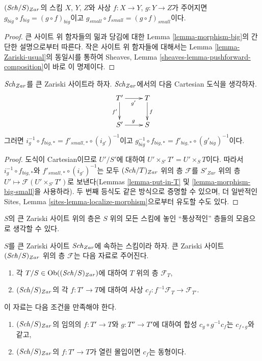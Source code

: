 \begin{lemma}
\label{lemma-composition}
$(\mathit{Sch}/S)_{Zar}$의 스킴 $X$, $Y$, $Z$와 사상 $f : X \to Y$,
$g : Y \to Z$가 주어지면
$g_{big} \circ f_{big} = (g \circ f)_{big}$이고
$g_{small} \circ f_{small} = (g \circ f)_{small}$이다.
\end{lemma}

\begin{proof}
큰 사이트 위 함자들의 밂과 당김에 대한 Lemma
\ref{lemma-morphism-big}의 간단한 설명으로부터 따른다. 작은 사이트 위
함자들에 대해서는 Lemma \ref{lemma-Zariski-usual}의 동일시를 통하여
Sheaves, Lemma \ref{sheaves-lemma-pushforward-composition}이 바로 이
명제이다.
\end{proof}

\begin{lemma}
\label{lemma-morphism-big-small-cartesian-diagram}
$\mathit{Sch}_{Zar}$를 큰 Zariski 사이트라 하자. $\mathit{Sch}_{Zar}$에서의 다음
Cartesian 도식을 생각하자.
$$
\xymatrix{
T' \ar[r]_{g'} \ar[d]_{f'} & T \ar[d]^f \\
S' \ar[r]^g & S
}
$$
그러면
$i_g^{-1} \circ f_{big, *} = f'_{small, *} \circ (i_{g'})^{-1}$이고
$g_{big}^{-1} \circ f_{big, *} = f'_{big, *} \circ (g'_{big})^{-1}$이다.
\end{lemma}

\begin{proof}
도식이 Cartesian이므로 $U'/S'$에 대하여
$U' \times_{S'} T' = U' \times_S T$이다. 따라서
$i_g^{-1} \circ f_{big, *}$와 $f'_{small, *} \circ (i_{g'})^{-1}$는 모두
$(\mathit{Sch}/T)_{Zar}$ 위의 층 $\mathcal{F}$를 $S'_{Zar}$ 위의 층
$U' \mapsto \mathcal{F}(U' \times_{S'} T')$로 보낸다(Lemmas
\ref{lemma-put-in-T} 및 \ref{lemma-morphism-big-small}을 사용하라).
두 번째 등식도 같은 방식으로 증명할 수 있으며, 더 일반적인 Sites,
Lemma \ref{sites-lemma-localize-morphism}으로부터 유도할 수도 있다.
\end{proof}

\noindent
$S$의 큰 Zariski 사이트 위의 층은 $S$ 위의 모든 스킴에 놓인
``통상적인'' 층들의 모음으로 생각할 수 있다.

\begin{lemma}
\label{lemma-characterize-sheaf-big}
$S$를 큰 Zariski 사이트 $\mathit{Sch}_{Zar}$에 속하는 스킴이라 하자. 큰
Zariski 사이트 $(\mathit{Sch}/S)_{Zar}$ 위의 층 $\mathcal{F}$는 다음 자료로
주어진다.
\begin{enumerate}
\item 각 $T/S \in \mathop{\mathrm{Ob}}\nolimits((\mathit{Sch}/S)_{Zar})$에 대하여 $T$ 위의 층
$\mathcal{F}_T$,
\item $(\mathit{Sch}/S)_{Zar}$의 각 $f : T' \to T$에 대하여 사상
$c_f : f^{-1}\mathcal{F}_T \to \mathcal{F}_{T'}$.
\end{enumerate}
이 자료는 다음 조건을 만족해야 한다.
\begin{enumerate}
\item[(a)] $(\mathit{Sch}/S)_{Zar}$의 임의의 $f : T' \to T$와
$g : T'' \to T'$에 대하여 합성 $c_g \circ g^{-1}c_f$는
$c_{f \circ g}$와 같고,
\item[(b)] $(\mathit{Sch}/S)_{Zar}$의 $f : T' \to T$가 열린 몰입이면
$c_f$는 동형이다.
\end{enumerate}
\end{lemma}

